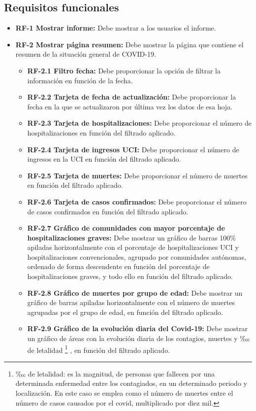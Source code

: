 \subsection{Requisitos funcionales}
\begin{itemize}
    \tightlist
    \item \textbf{RF-1 Mostrar informe:} Debe mostrar a los usuarios el informe.
    \item \textbf{RF-2 Mostrar página resumen:} Debe mostrar la página que contiene el resumen de la situación general de COVID-19.
    \begin{itemize}
        \tightlist
            \item \textbf{RF-2.1 Filtro fecha:} Debe proporcionar la opción de filtrar la información en función de la fecha.
            \item \textbf{RF-2.2 Tarjeta de fecha de actualización:} Debe proporcionar la fecha en la que se actualizaron por última vez los datos de esa hoja.
            \item \textbf{RF-2.3 Tarjeta de hospitalizaciones:} Debe proporcionar el número de hospitalizaciones en función del filtrado aplicado.
            \item \textbf{RF-2.4 Tarjeta de ingresos UCI:} Debe proporcionar el número de ingresos en la UCI en función del filtrado aplicado.
            \item \textbf{RF-2.5 Tarjeta de muertes:} Debe proporcionar el número de muertes en función del filtrado aplicado.
             \item \textbf{RF-2.6 Tarjeta de casos confirmados:} Debe proporcionar el número de casos confirmados en función del filtrado aplicado.
            \item \textbf{RF-2.7 Gráfico de comunidades con mayor porcentaje de hospitalizaciones graves:} Debe mostrar un gráfico de barras 100\% apiladas horizontalmente con el porcentaje de hospitalizaciones UCI y hospitalizaciones convencionales, agrupado por comunidades autónomas, ordenado de forma descendente en función del porcentaje de hospitalizaciones graves, y todo ello en función del filtrado aplicado.
            \item \textbf{RF-2.8 Gráfico de muertes por grupo de edad:} Debe mostrar un gráfico de barras apiladas horizontalmente con el número de muertes agrupadas por el grupo de edad, en función del filtrado aplicado.
            \item \textbf{RF-2.9 Gráfico de la evolución diaria del Covid-19:} Debe mostrar un gráfico de áreas con la evolución diaria de los contagios, muertes y ‱ de letalidad \footnote{‱ de letalidad: es la magnitud, de personas que fallecen por una determinada enfermedad entre los contagiados, en un determinado periodo y localización. En este caso se emplea como el número de muertes entre el número de casos causados por el covid, multiplicado por diez mil.} , en función del filtrado aplicado.

\end{itemize}
\end{itemize}
